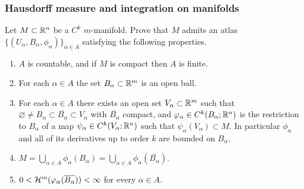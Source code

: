\documentclass[a4paper]{article}
\begin{document}
\subsubsection{Hausdorff measure and integration on 
manifolds}

\begin{thm}
Let $M \subset \mathbb{R}^n$ be a $C^k$ $m$-manifold.
Prove that $M$ admits an atlas $\{(U_\alpha,B_\alpha,
\phi_\alpha)\}_{\alpha \in A}$ satisfying the
following properties.
\begin{enumerate}
\item $A$ is countable, and if $M$ is compact then $A$
is finite.
\item For each $\alpha \in A$ the set $B_\alpha \subset
\mathbb{R}^m$ is an open ball.
\item For each $\alpha \in A$ there exists an open set
$V_\alpha \subset \mathbb{R}^m$ such that $\varnothing \neq
B_\alpha \subset \bar{B_\alpha} \subset V_\alpha$ with
$\bar{B_\alpha}$ compact, and $\varphi_\alpha \in
C^k(B_\alpha;\mathbb{R}^n)$ is the restriction to $B_\alpha$ of
a map $\psi_\alpha \in C^k(V_\alpha;\mathbb{R}^n)$ such that
$\psi_\alpha(V_\alpha) \subset M$. In particular
$\phi_\alpha$ and all of its derivatives up to order
$k$ are bounded on $B_\alpha$.

\item $M = \bigcup_{\alpha \in A} \phi_\alpha(B_\alpha)
= \bigcup_{\alpha \in A} \phi_{\alpha}(\bar{B_\alpha})$.

\item $0 < \mathcal{H}^m(\varphi_\alpha(\overline{B_\alpha})) < \infty$
for every $\alpha \in A$.
\end{enumerate}
\end{thm}
\end{document}
